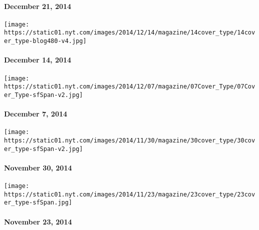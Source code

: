 \hypertarget{december-21-2014}{%
\paragraph{December 21, 2014}\label{december-21-2014}}

\href{http://www.nytimes.com/indexes/2014/12/14/magazine/index.html}{}

\texttt{[image: https://static01.nyt.com/images/2014/12/14/magazine/14cover\_type/14cover\_type-blog480-v4.jpg]}

\hypertarget{december-14-2014}{%
\paragraph{December 14, 2014}\label{december-14-2014}}

\href{http://www.nytimes.com/indexes/2014/12/07/magazine/index.html}{}

\texttt{[image: https://static01.nyt.com/images/2014/12/07/magazine/07Cover\_Type/07Cover\_Type-sfSpan-v2.jpg]}

\hypertarget{december-7-2014}{%
\paragraph{December 7, 2014}\label{december-7-2014}}

\href{http://www.nytimes.com/indexes/2014/11/30/magazine/index.html}{}

\texttt{[image: https://static01.nyt.com/images/2014/11/30/magazine/30cover\_type/30cover\_type-sfSpan-v2.jpg]}

\hypertarget{november-30-2014}{%
\paragraph{November 30, 2014}\label{november-30-2014}}

\href{http://www.nytimes.com/indexes/2014/11/23/magazine/index.html}{}

\texttt{[image: https://static01.nyt.com/images/2014/11/23/magazine/23cover\_type/23cover\_type-sfSpan.jpg]}

\hypertarget{november-23-2014}{%
\paragraph{November 23, 2014}\label{november-23-2014}}

\href{http://www.nytimes.com/indexes/2014/11/16/magazine/index.html}{}

